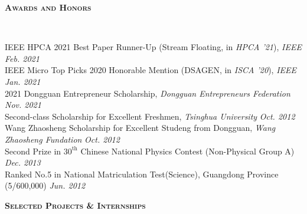 \documentclass[a4paper]{article}
\newenvironment{changemargin}[2]{%
  \begin{list}{}{%
    \setlength{\topsep}{0pt}%
    \setlength{\leftmargin}{#1}%
    \setlength{\rightmargin}{#2}%
    \setlength{\listparindent}{\parindent}%
    \setlength{\itemindent}{\parindent}%
    \setlength{\parsep}{\parskip}%
  }%
  \item[]}{\end{list}
}
\newcommand{\lineover}{
	\begin{changemargin}{-0.05in}{-0.05in}
		\vspace*{-8pt}
		\hrulefill \\
		\vspace*{-2pt}
	\end{changemargin}
}
\newcommand{\header}[1]{
	\begin{changemargin}{-0.5in}{-0.5in}
		\scshape{\textbf{#1}}\\
  	\lineover
	\end{changemargin}
}
\newenvironment{body} {
	\vspace*{-16pt}
	\begin{changemargin}{-0.5in}{-0.5in}
  }	
	{\end{changemargin}
}
\begin{document}
\smallskip
\smallskip


\header{Awards and Honors}

\begin{body}
	\vspace{14pt}
	IEEE HPCA 2021 Best Paper Runner-Up (Stream Floating, in \emph{HPCA '21}), \emph{IEEE} \hfill{} \emph{Feb. 2021}\\
	\smallskip
	IEEE Micro Top Picks 2020 Honorable Mention (DSAGEN, in \emph{ISCA '20}), \emph{IEEE} \hfill{} \emph{Jan. 2021}\\
	\smallskip
	2021 Dongguan Entrepreneur Scholarship, \emph{Dongguan Entrepreneurs Federation} \hfill{} \emph{Nov. 2021}\\
	\smallskip
	Second-class Scholarship for Excellent Freshmen, \emph{Tsinghua University} \hfill{} \emph{Oct. 2012}\\
	\smallskip
	Wang Zhaosheng Scholarship for Excellent Studeng from Dongguan, \emph{Wang Zhaosheng Fundation} \hfill{} \emph{Oct. 2012}\\
	\smallskip
	Second Prize in $30^{\mathrm{th}}$ Chinese National Physics Contest (Non-Physical Group A) \hfill{} \emph{Dec. 2013}\\
	\smallskip
	Ranked No.5 in National Matriculation Test(Science), Guangdong Province (5/600,000) \hfill{} \emph{Jun. 2012}
\end{body}

\smallskip
\smallskip

\header{Selected Projects \& Internships}
\end{document}

